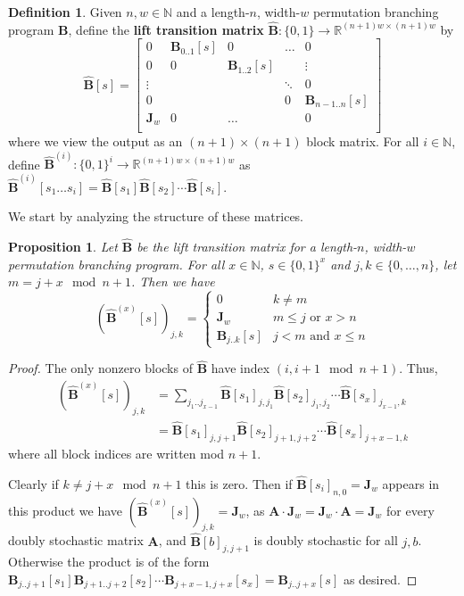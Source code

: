 \documentclass[11pt]{article}
\numberwithin{equation}{section}
\newtheorem{proposition}[theorem]{Proposition}
\theoremstyle{definition}
\newtheorem{definition}[theorem]{Definition}
\theoremstyle{plain}
\newcommand{\R}{\mathbb R}
\newcommand{\N}{\mathbb N}
\newcommand{\zo}{\{0,1\}}
\newcommand{\ra}{\rightarrow}
\newcommand{\mA}{\mathbf{A}}
\newcommand{\Jw}{\mathbf{J}_w}
\newcommand{\bp}{{\mathbf{B}}}
\newcommand{\hbp}{{\mathbf{\hat{B}}}}
\begin{document}
\begin{definition}\label{def:hbp}
Given $n,w\in \N$ and a length-$n$, width-$w$ permutation branching program $\bp$, define the \textbf{lift transition matrix} $\hbp:\zo\ra \R^{(n+1)w\times(n+1)w}$ by
\[\hbp[s] = \begin{bmatrix}
0 & \bp_{0..1}[s] & 0 & \dots & 0\\
0 & 0 & \bp_{1..2}[s] &  & \vdots\\
\vdots & &  & \ddots & 0\\
0 & ~ &   & 0 & \bp_{n-1..n}[s]\\
\Jw & 0 & \dots & & 0\\
\end{bmatrix}\]
where we view the output as an $(n+1)\times(n+1)$ block matrix. For all $i\in\N$, define $\hbp^{(i)}:\zo^{i}\ra \R^{(n+1)w\times(n+1)w}$ as $\hbp^{(i)}[s_1\dots s_i]=\hbp[s_1]\hbp[s_2]\cdots\hbp[s_{i}]$.
\end{definition}

We start by analyzing the structure of these matrices.
\begin{proposition}\label{prop:HBPstruct}
Let $\hbp$ be the lift transition matrix for a length-$n$, width-$w$ permutation branching program. %
For  %
all $x \in \N$, $s \in \zo^x$ and $j,k\in \{0,\ldots,n\}$, let $m=j+x\mod n+1$. 
%
Then we have  %
\[(\hbp^{(x)}[s])_{j,k} = \begin{cases}
0 & k\neq m\\
\Jw & m \leq j \text{ or } x>n\\
\bp_{j..k}[s] & j < m \text{ and } x\leq n
\end{cases}\]
\end{proposition}
\begin{proof}
The only nonzero blocks of $\hbp$ have index $(i,i+1 \mod n+1)$. Thus, 
\begin{align*}
    \left(\hbp^{(x)}[s]\right)_{j,k} &= \sum_{j_1..j_{x-1}}\hbp[s_1]_{j,j_1}\hbp[s_2]_{j_1,j_2}\cdots \hbp[s_x]_{j_{x-1},k}\\
    &= \hbp[s_1]_{j,j+1}\hbp[s_2]_{j+1,j+2}\cdots \hbp[s_x]_{j+x-1,k} %
\end{align*}
%
where %
all block indices are written mod $n+1$.

Clearly if $k\neq j+x\mod n+1$ this is zero. Then if $\hbp[s_i]_{n,0}=\Jw$ appears in this product we have $(\hbp^{(x)}[s])_{j,k}=\Jw$, as $\mA\cdot\Jw=\Jw\cdot\mA=\Jw$ for every doubly stochastic matrix $\mA$, and $\hbp[b]_{j,j+1}$ is doubly stochastic for all $j,b$. Otherwise the product is of the form $\bp_{j..j+1}[s_1]\bp_{j+1..j+2}[s_2]\cdots \bp_{j+x-1,j+x}[s_x]=\bp_{j..j+x}[s]$ as desired.
\end{proof}
\end{document}
